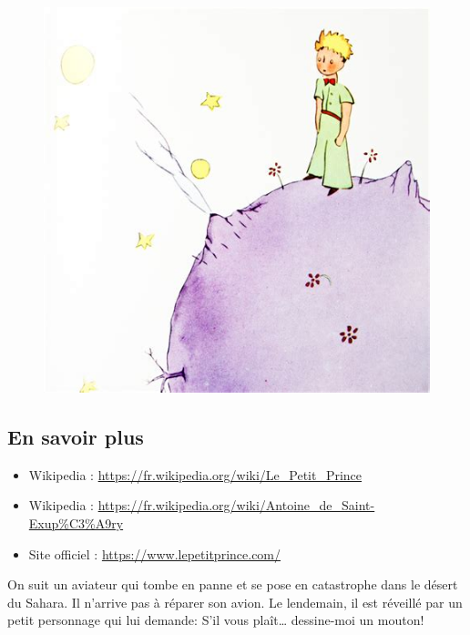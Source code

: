 \begin{multicols}{2}

  \begin{figure}[H]
    \centering
    \includegraphics[width=0.8\linewidth]{5x6-calcul-litteral/pp.png}
  \end{figure}

\subsection*{En savoir plus}

\begin{itemize}
\item Wikipedia : \url{https://fr.wikipedia.org/wiki/Le_Petit_Prince}
\item Wikipedia : \url{https://fr.wikipedia.org/wiki/Antoine_de_Saint-Exup%C3%A9ry}
\item Site officiel : \url{https://www.lepetitprince.com/}
\end{itemize}


On suit un aviateur qui tombe en panne et se pose en catastrophe dans le désert du Sahara. Il n’arrive pas à réparer son avion. Le lendemain, il est réveillé par un petit personnage qui lui demande: \og S'il vous plaît… dessine-moi un mouton! \fg 

\end{multicols}

\horrule{1px}


